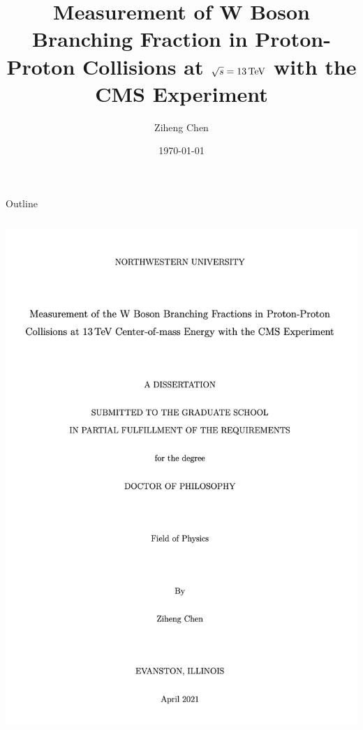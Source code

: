 \documentclass[xcolor=dvipsnames, 10pt]{beamer}
\title[\BWl measurement]{Measurement of W Boson Branching Fraction in Proton-Proton Collisions at $\sqrt{s} = 13\,\text{Te\hspace{-.08em}V}$  with the CMS Experiment}
\date{\today}
\author[Z. Chen]{Ziheng Chen}
\institute[NWU]{Department of Physics and Astronomy, \\ Northwestern University}
\begin{document}
\begin{frame}{} \titlepage \end{frame}

\begin{frame}{Outline}

    \begin{columns}
        \setcounter{tocdepth}{1}
        \tableofcontents
        
        \begin{block}
            \centering
            \includegraphics[width=\textwidth]{slides/figures/thesisFrontPage.png}
        \end{block}
    \end{columns}
\end{frame}










\appendix



\begin{frame}[allowframebreaks]
    \tiny{
    
    
    }
\end{frame}
\end{document}
